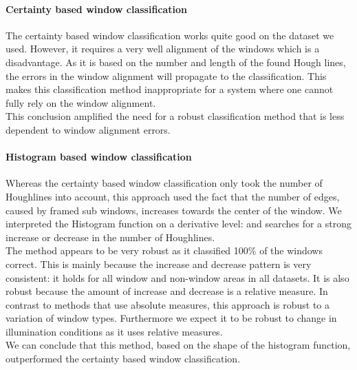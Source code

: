	\paragraph{Certainty based window classification} %
	The certainty based window classification works quite good on
	the dataset we used.  However, it requires a very well alignment of the windows which
	is a disadvantage.  As it is based on the number and length of the found Hough lines, the
	errors in the window alignment will propagate to the classification.  This
	makes this classification method inappropriate for a system where one cannot
	fully rely on the window alignment.  \\
	This conclusion amplified the need for a robust classification method that is
	less dependent to window alignment errors. 

	\paragraph{Histogram based window classification} 
	Whereas the certainty based window classification only took the number of
	Houghlines into account, this approach used 
	the fact that the number of edges, caused by framed sub windows, increases
	towards the center of the window.
	We interpreted the Histogram function on a derivative level:
	and searches for a strong increase or decrease in the number of
	Houghlines. \\
	The method appears to be very robust as it classified 100\% of the windows correct.
	This is mainly because the increase and decrease pattern is very consistent: it
	holds for all window and non-window areas in all datasets.
	It is also robust because the amount of increase and decrease is a relative 
	measure. In contrast to methods that use absolute measures, this approach is
	robust to a variation of window types. Furthermore we expect it to be robust
	to change in illumination conditions as it uses relative measures.\\

	We can conclude that this method, based on the shape of the histogram
	function, outperformed the certainty based window classification.

